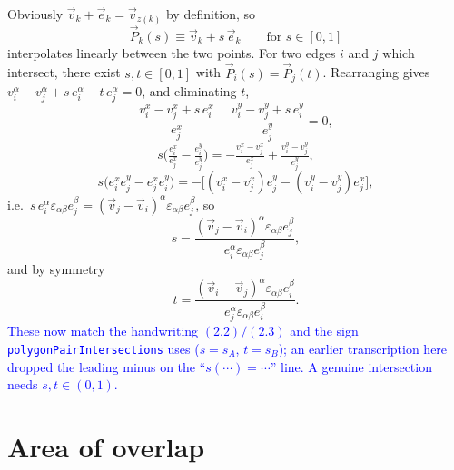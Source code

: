 \documentclass[11pt]{article}
\numberwithin{equation}{section}
\newcommand{\vv}[1]{\vec{#1}}
\newcommand{\eps}{\varepsilon}
\newcommand{\cam}[1]{\textcolor{blue}{#1}}
\begin{document}
Obviously $\vv v_k+\vv e_k=\vv v_{z(k)}$ by definition, so
\begin{equation}
  \vv P_k(s)\equiv\vv v_k+s\,\vv e_k \qquad\text{for }s\in[0,1]
\end{equation}
interpolates linearly between the two points. For two edges $i$ and $j$ which intersect, there exist
$s,t\in[0,1]$ with $\vv P_i(s)=\vv P_j(t)$. Rearranging gives $v_i^\alpha-v_j^\alpha+s\,e_i^\alpha-t\,e_j^\alpha=0$,
and eliminating $t$,
\[
  \frac{v_i^x-v_j^x+s\,e_i^x}{e_j^x}-\frac{v_i^y-v_j^y+s\,e_i^y}{e_j^y}=0,
\]
\[
  s\Big(\tfrac{e_i^x}{e_j^x}-\tfrac{e_i^y}{e_j^y}\Big)=-\tfrac{v_i^x-v_j^x}{e_j^x}+\tfrac{v_i^y-v_j^y}{e_j^y},
\]
\[
  s\big(e_i^x e_j^y-e_j^x e_i^y\big)=-\big[(v_i^x-v_j^x)e_j^y-(v_i^y-v_j^y)e_j^x\big],
\]
i.e.\ $s\,e_i^\alpha\eps_{\alpha\beta}e_j^\beta=(\vv v_j-\vv v_i)^\alpha\eps_{\alpha\beta}e_j^\beta$, so
\begin{equation}
  s=\frac{(\vv v_j-\vv v_i)^\alpha\eps_{\alpha\beta}e_j^\beta}{e_i^\alpha\eps_{\alpha\beta}e_j^\beta},
\end{equation}
and by symmetry
\begin{equation}
  t=\frac{(\vv v_i-\vv v_j)^\alpha\eps_{\alpha\beta}e_i^\beta}{e_j^\alpha\eps_{\alpha\beta}e_i^\beta}.
\end{equation}
\cam{These now match the handwriting $(2.2)/(2.3)$ and the sign \texttt{polygonPairIntersections} uses
($s=s_A$, $t=s_B$); an earlier transcription here dropped the leading minus on the
``$s(\cdots)=\cdots$'' line. A genuine intersection needs $s,t\in(0,1)$.}

\section{Area of overlap}
\end{document}
